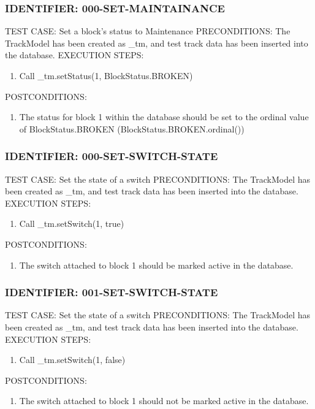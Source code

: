 \documentclass{scrreprt}
\begin{document}
\subsubsection{IDENTIFIER: 000-SET-MAINTAINANCE}
TEST CASE: Set a block's status to Maintenance
PRECONDITIONS: The TrackModel has been created as _tm, and test track data has been inserted into the database.
EXECUTION STEPS:
\begin{enumerate}
	\item Call _tm.setStatus(1, BlockStatus.BROKEN)
\end{enumerate}
POSTCONDITIONS:
\begin{enumerate}
	\item The status for block 1 within the database should be set to the ordinal value of BlockStatus.BROKEN (BlockStatus.BROKEN.ordinal())
\end{enumerate}

\subsubsection{IDENTIFIER: 000-SET-SWITCH-STATE}
TEST CASE: Set the state of a switch
PRECONDITIONS: The TrackModel has been created as _tm, and test track data has been inserted into the database.
EXECUTION STEPS:
\begin{enumerate}
	\item Call _tm.setSwitch(1, true)
\end{enumerate}
POSTCONDITIONS:
\begin{enumerate}
	\item The switch attached to block 1 should be marked active in the database.
\end{enumerate}

\subsubsection{IDENTIFIER: 001-SET-SWITCH-STATE}
TEST CASE: Set the state of a switch
PRECONDITIONS: The TrackModel has been created as _tm, and test track data has been inserted into the database.
EXECUTION STEPS:
\begin{enumerate}
	\item Call _tm.setSwitch(1, false)
\end{enumerate}
POSTCONDITIONS:
\begin{enumerate}
	\item The switch attached to block 1 should not be marked active in the database. 
\end{enumerate}
\end{document}
